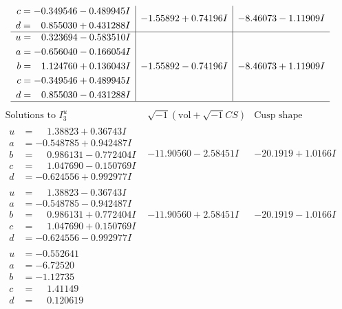 \documentclass[1p]{elsarticle_modified}
\theoremstyle{definition}
\newcommand{\I}{\sqrt{-1}}
\begin{document}
$$\begin{array}{c|c|c}
\begin{aligned}
c &= -0.349546 - 0.489945 I \\
d &= \phantom{-}0.855030 + 0.431288 I\end{aligned}
 & -1.55892 + 0.74196 I & -8.46073 - 1.11909 I \\ \hline\begin{aligned}
u &= \phantom{-}0.323694 - 0.583510 I \\
a &= -0.656040 - 0.166054 I \\
b &= \phantom{-}1.124760 + 0.136043 I \\
c &= -0.349546 + 0.489945 I \\
d &= \phantom{-}0.855030 - 0.431288 I\end{aligned}
 & -1.55892 - 0.74196 I & -8.46073 + 1.11909 I\\
 \hline 
 \end{array}$$\newpage$$\begin{array}{c|c|c}  
\text{Solutions to }I^u_{3}& \I (\text{vol} + \sqrt{-1}CS) & \text{Cusp shape}\\
 \hline 
\begin{aligned}
u &= \phantom{-}1.38823 + 0.36743 I \\
a &= -0.548785 + 0.942487 I \\
b &= \phantom{-}0.986131 - 0.772404 I \\
c &= \phantom{-}1.047690 - 0.150769 I \\
d &= -0.624556 + 0.992977 I\end{aligned}
 & -11.90560 - 2.58451 I & -20.1919 + 1.0166 I \\ \hline\begin{aligned}
u &= \phantom{-}1.38823 - 0.36743 I \\
a &= -0.548785 - 0.942487 I \\
b &= \phantom{-}0.986131 + 0.772404 I \\
c &= \phantom{-}1.047690 + 0.150769 I \\
d &= -0.624556 - 0.992977 I\end{aligned}
 & -11.90560 + 2.58451 I & -20.1919 - 1.0166 I \\ \hline\begin{aligned}
u &= -0.552641\phantom{ +0.000000I} \\
a &= -6.72520\phantom{ +0.000000I} \\
b &= -1.12735\phantom{ +0.000000I} \\
c &= \phantom{-}1.41149\phantom{ +0.000000I} \\
d &= \phantom{-}0.120619\phantom{ +0.000000I}\end{aligned}

\end{array}$$
\end{document}
